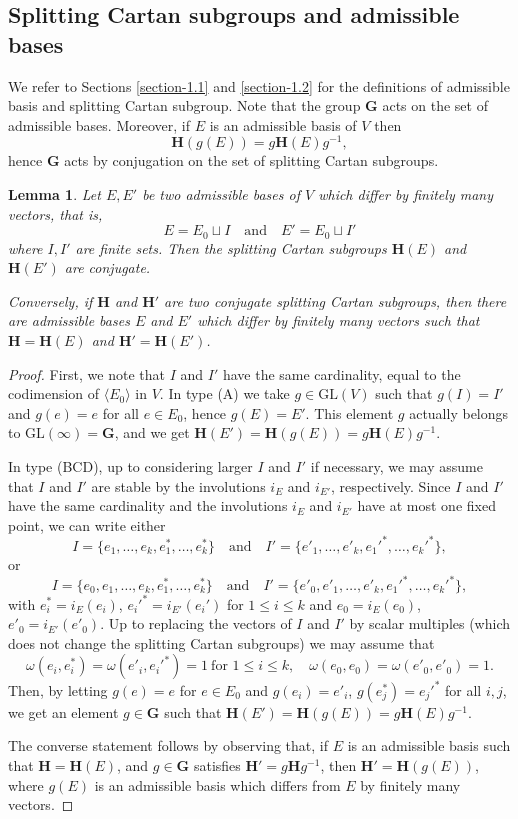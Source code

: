 \documentclass[12pt]{amsart}
\newcommand{\GL}{\mathrm{GL}}
\newcommand{\G}{\mathbf{G}}
\renewcommand{\H}{\mathbf{H}}
\renewcommand{\span}[1]{\langle #1\rangle}
\numberwithin{equation}{section}
\newtheorem{lemma}[theorem]{Lemma}
\theoremstyle{definition}
\begin{document}
\subsection{Splitting Cartan subgroups and admissible bases}

\label{section-2.1}

We refer to Sections \ref{section-1.1} and \ref{section-1.2} for the definitions of admissible basis and splitting Cartan subgroup.
Note that the group $\G$ acts on the set of admissible bases. Moreover, if $E$ is an admissible basis of $V$ then \[
\H(g(E))=g\H(E)g^{-1},
\]
hence $\G$ acts by conjugation on the set of splitting Cartan subgroups. 



\begin{lemma}
\label{L2.1}
Let $E,E'$ be two admissible bases of $V$ which differ by finitely many vectors, that is, 
\[E=E_0\sqcup I\quad\mbox{and}\quad E'=E_0\sqcup I'\]
where $I,I'$ are finite sets. Then the splitting Cartan subgroups $\H(E)$ and $\H(E')$ are conjugate. 

Conversely, if $\H$ and $\H'$ are two conjugate splitting Cartan subgroups,
then there are admissible bases $E$ and $E'$ which differ by finitely many vectors such that $\H=\H(E)$ and $\H'=\H(E')$.
\end{lemma}

\begin{proof} 
First, we note that $I$ and $I'$ have the same cardinality, equal to the codimension of $\span{E_0}$ in $V$.
In type (A) we take $g\in\GL(V)$ such that $g(I)=I'$ and $g(e)=e$ for all $e\in E_0$, hence $g(E)=E'$. This element $g$ actually belongs to $\GL(\infty)=\G$, and we get $\H(E')=\H(g(E))=g\H(E)g^{-1}$.

In type (BCD), 
up to considering larger $I$ and $I'$ if necessary, we may assume that $I$ and $I'$ are stable by the involutions $i_E$ and $i_{E'}$, respectively. Since $I$ and $I'$ have the same cardinality and the involutions $i_E$ and $i_{E'}$ have at most one fixed point, we can write either
\[
I=\{e_1,\ldots,e_k,e_1^*,\ldots,e_k^*\}\quad\mbox{and}\quad I'=\{e'_1,\ldots,e'_k,e_1'^*,\ldots,e_k'^*\},
\]
or
\[
I=\{e_0,e_1,\ldots,e_k,e_1^*,\ldots,e_k^*\}\quad\mbox{and}\quad I'=\{e'_0,e'_1,\ldots,e'_k,e_1'^*,\ldots,e_k'^*\},
\]
with $e_i^*=i_E(e_i)$, $e_i'^*=i_{E'}(e_i')$ for $1\leq i\leq k$ and $e_0=i_E(e_0)$, $e'_0=i_{E'}(e'_0)$.
Up to replacing the vectors of $I$ and $I'$ by scalar multiples (which does not change the splitting Cartan subgroups) we may assume that
\[\omega(e_i,e_i^*)=\omega(e'_i,e_i'^*)=1\ \mbox{for $1\leq i\leq k$},\quad \omega(e_0,e_0)=\omega(e'_0,e'_0)=1.\]
Then, by letting $g(e)=e$ for $e\in E_0$ and $g(e_i)=e'_i$, $g(e_j^*)=e_j'^*$ for all $i,j$, we get an element $g\in\G$ such that $\H(E')=\H(g(E))=g\H(E)g^{-1}$.

The converse statement follows by observing that, if $E$ is an admissible basis such that $\H=\H(E)$, and $g\in\G$ satisfies $\H'=g\H g^{-1}$, then $\H'=\H(g(E))$, where $g(E)$ is an admissible basis which differs from $E$ by finitely many vectors.
\end{proof}
\end{document}
